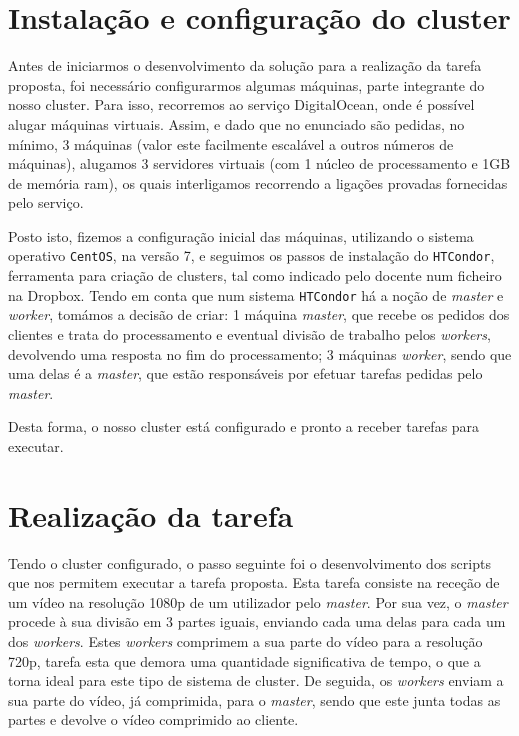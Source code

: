 \documentclass[a4paper]{report}
\begin{document}
    \section{Instalação e configuração do cluster}
	Antes de iniciarmos o desenvolvimento da solução para a realização da tarefa proposta, foi necessário configurarmos algumas máquinas, parte integrante do nosso cluster. Para isso, recorremos ao serviço DigitalOcean, onde é possível alugar máquinas virtuais. Assim, e dado que no enunciado são pedidas, no mínimo, 3 máquinas (valor este facilmente escalável a outros números de máquinas), alugamos 3 servidores virtuais (com 1 núcleo de processamento e 1GB de memória ram), os quais interligamos recorrendo a ligações provadas fornecidas pelo serviço.
	
	Posto isto, fizemos a configuração inicial das máquinas, utilizando o sistema operativo \texttt{CentOS}, na versão 7, e seguimos os passos de instalação do \texttt{HTCondor}, ferramenta para criação de clusters, tal como indicado pelo docente num ficheiro na Dropbox.
	Tendo em conta que num sistema \texttt{HTCondor} há a noção de \textit{master} e \textit{worker}, tomámos a decisão de criar: 1 máquina \textit{master}, que recebe os pedidos dos clientes e trata do processamento e eventual divisão de trabalho pelos \textit{workers}, devolvendo uma resposta no fim do processamento; 3 máquinas \textit{worker}, sendo que uma delas é a \textit{master}, que estão responsáveis por efetuar tarefas pedidas pelo \textit{master}.
	
	Desta forma, o nosso cluster está configurado e pronto a receber tarefas para executar.
    
    \section{Realização da tarefa}
    Tendo o cluster configurado, o passo seguinte foi o desenvolvimento dos scripts que nos permitem executar a tarefa proposta. Esta tarefa consiste na receção de um vídeo na resolução 1080p de um utilizador pelo \textit{master}. Por sua vez, o \textit{master} procede à sua divisão em 3 partes iguais, enviando cada uma delas para cada um dos \textit{workers}. Estes \textit{workers} comprimem a sua parte do vídeo para a resolução 720p, tarefa esta que demora uma quantidade significativa de tempo, o que a torna ideal para este tipo de sistema de cluster. De seguida, os \textit{workers} enviam a sua parte do vídeo, já comprimida, para o \textit{master}, sendo que este junta todas as partes e devolve o vídeo comprimido ao cliente.
    
\end{document}
